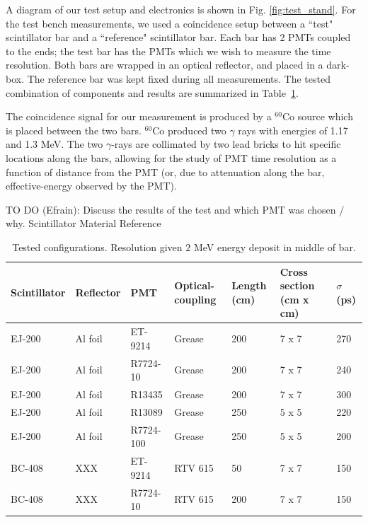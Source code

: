 \documentclass[3p,final,twocolumn]{elsarticle}
\begin{document}
A diagram of our test setup and electronics is shown in Fig. \ref{fig:test_stand}. For the test bench measurements, we used a coincidence setup between a ``test" scintillator bar and a ``reference" scintillator bar. Each bar has 2 PMTs 
coupled to the ends; the test bar has the PMTs which we wish to measure the time resolution. Both bars are wrapped in an optical reflector, and placed in a dark-box. The reference bar was kept fixed during all measurements. The tested combination of components and results are summarized in Table~\ref{tab:tests}. 

The coincidence signal for our measurement is produced by a $^{60}$Co source which is placed between the two bars. $^{60}$Co produced  
two $\gamma$ rays with energies of 1.17  and  1.3 \si{\mega\electronvolt}. The two $\gamma$-rays are collimated by two lead bricks to hit specific locations along the bars, allowing for the 
study of PMT time resolution as a function of distance from the PMT (or, due to attenuation along the bar, effective-energy observed by the PMT).

{\color{red}TO DO (Efrain): Discuss the results of the test and which PMT was chosen / why.}
Scintillator Material Reference \cite{scint-mat-ref}


\begin{table}[t!]
	\caption{Tested configurations. Resolution given $2$ \si{\mega\electronvolt} energy deposit in middle of bar.}
	\begin{tabular}{  m{5em} | m{4em} | m{5em} | m{4em} | m{3em} |  m{5.7em} | m{3em} }
		\hline
			Scintillator & Reflector & PMT & Optical-coupling & Length (cm) & Cross section (\si{\centi\meter} x \si{\centi\meter}) & $\sigma$ (\si{\pico\second})\\
		\hline
		\hline
			EJ-200 & Al foil & ET-9214 & Grease & 200 & 7 x 7 & 270			\\
		
			EJ-200 & Al foil & R7724-10 & Grease & 200 & 7 x 7 & 240		\\
			EJ-200 & Al foil & R13435 & Grease & 200 & 7 x 7 & 300 			\\
		
			EJ-200 & Al foil & R13089 & Grease & 250 & 5 x 5  & 220			\\
			EJ-200 & Al foil & R7724-100 & Grease & 250 & 5 x 5 & 200 		\\
			
			BC-408 & XXX & ET-9214 & RTV 615 &50 & 7 x 7 & 150				\\
			BC-408 & XXX & R7724-10 & RTV 615 & 200 & 7 x 7 & 150			\\
		\hline
	\end{tabular}
	\label{tab:tests}
\end{table}
\end{document}
